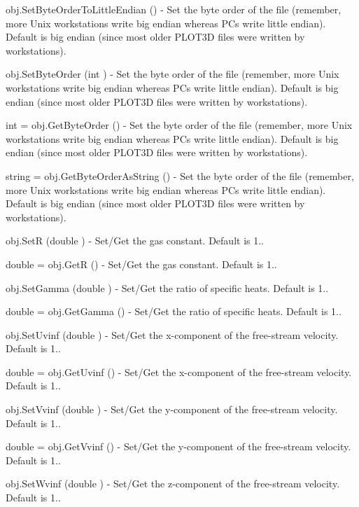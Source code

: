 \begin{DoxyItemize}
\item {\ttfamily obj.\-Set\-Byte\-Order\-To\-Little\-Endian ()} -\/ Set the byte order of the file (remember, more Unix workstations write big endian whereas P\-Cs write little endian). Default is big endian (since most older P\-L\-O\-T3\-D files were written by workstations).  
\item {\ttfamily obj.\-Set\-Byte\-Order (int )} -\/ Set the byte order of the file (remember, more Unix workstations write big endian whereas P\-Cs write little endian). Default is big endian (since most older P\-L\-O\-T3\-D files were written by workstations).  
\item {\ttfamily int = obj.\-Get\-Byte\-Order ()} -\/ Set the byte order of the file (remember, more Unix workstations write big endian whereas P\-Cs write little endian). Default is big endian (since most older P\-L\-O\-T3\-D files were written by workstations).  
\item {\ttfamily string = obj.\-Get\-Byte\-Order\-As\-String ()} -\/ Set the byte order of the file (remember, more Unix workstations write big endian whereas P\-Cs write little endian). Default is big endian (since most older P\-L\-O\-T3\-D files were written by workstations).  
\item {\ttfamily obj.\-Set\-R (double )} -\/ Set/\-Get the gas constant. Default is 1..  
\item {\ttfamily double = obj.\-Get\-R ()} -\/ Set/\-Get the gas constant. Default is 1..  
\item {\ttfamily obj.\-Set\-Gamma (double )} -\/ Set/\-Get the ratio of specific heats. Default is 1..  
\item {\ttfamily double = obj.\-Get\-Gamma ()} -\/ Set/\-Get the ratio of specific heats. Default is 1..  
\item {\ttfamily obj.\-Set\-Uvinf (double )} -\/ Set/\-Get the x-\/component of the free-\/stream velocity. Default is 1..  
\item {\ttfamily double = obj.\-Get\-Uvinf ()} -\/ Set/\-Get the x-\/component of the free-\/stream velocity. Default is 1..  
\item {\ttfamily obj.\-Set\-Vvinf (double )} -\/ Set/\-Get the y-\/component of the free-\/stream velocity. Default is 1..  
\item {\ttfamily double = obj.\-Get\-Vvinf ()} -\/ Set/\-Get the y-\/component of the free-\/stream velocity. Default is 1..  
\item {\ttfamily obj.\-Set\-Wvinf (double )} -\/ Set/\-Get the z-\/component of the free-\/stream velocity. Default is 1..  

\end{DoxyItemize}
